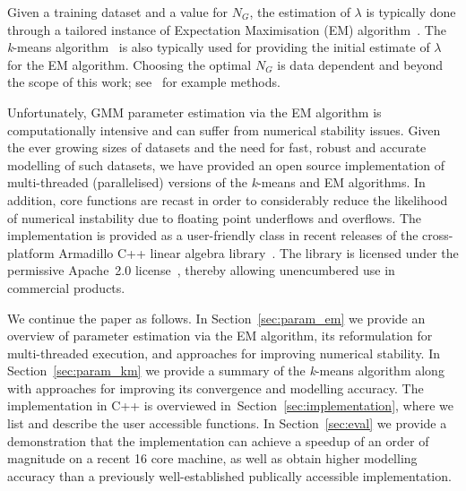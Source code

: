 Given a training dataset and a value for $N_G$,
the estimation of $\lambda$ is typically done through a
tailored instance of Expectation Maximisation (EM) algorithm~\cite{Dempster77, McLachlan-2008, Moon96, Redner84}.
The {\it k}-means algorithm~\cite{Bishop_2006,Duda01,Linde80} is also typically used for providing the initial estimate of $\lambda$ for the EM algorithm.
Choosing the optimal $N_G$ is data dependent and beyond the scope of this work; see~\cite{Hamerly_2003,Pelleg_2000} for example methods.

Unfortunately, GMM parameter estimation via the EM algorithm is computationally intensive
and can suffer from numerical stability issues.
Given the ever growing sizes of datasets and the need for fast, robust and accurate modelling of such datasets,
we have provided an open source implementation of multi-threaded (parallelised) versions 
of the \mbox{{\it k}-means} and EM algorithms.
In addition, core functions are recast in order to considerably reduce the likelihood of numerical instability due to floating point underflows and overflows.
The implementation is provided as a user-friendly class in recent releases of the cross-platform Armadillo C++ linear algebra library~\cite{Armadillo_JOSS_2016}.
The library is licensed under the permissive Apache~2.0 license~\cite{Laurent_2008},
thereby allowing unencumbered use in commercial products.

We continue the paper as follows.
In Section~\ref{sec:param_em} we provide an overview of parameter estimation via the EM algorithm,
its reformulation for multi-threaded execution,
and approaches for improving numerical stability.
In Section~\ref{sec:param_km} we provide a summary of the {\it k}-means algorithm
along with approaches for improving its convergence and modelling accuracy.
The implementation in C++ is overviewed in~Section~\ref{sec:implementation},
where we list and describe the user accessible functions.
In Section~\ref{sec:eval}
we provide a demonstration that the implementation can achieve a speedup of an order of magnitude on a recent 16 core machine,
as well as obtain higher modelling accuracy than a previously well-established publically accessible implementation.




